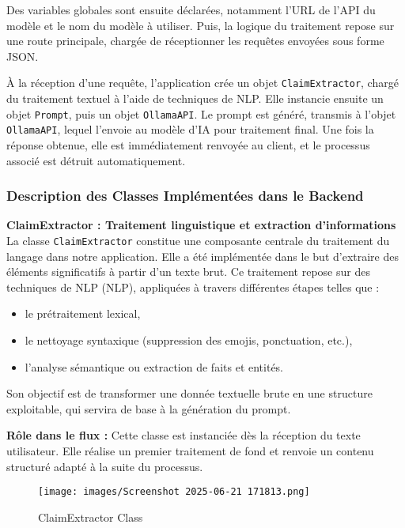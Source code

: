 \begin{description}
\begin{description}
Des variables globales sont ensuite déclarées, notamment l'URL de l'API du modèle et le nom du modèle à utiliser. Puis, la logique du traitement repose sur une route principale, chargée de réceptionner les requêtes envoyées sous forme JSON.

À la réception d'une requête, l'application crée un objet \texttt{ClaimExtractor}, chargé du traitement textuel à l'aide de techniques de NLP. Elle instancie ensuite un objet \texttt{Prompt}, puis un objet \texttt{OllamaAPI}. Le prompt est généré, transmis à l'objet \texttt{OllamaAPI}, lequel l'envoie au modèle d'IA pour traitement final. Une fois la réponse obtenue, elle est immédiatement renvoyée au client, et le processus associé est détruit automatiquement.
\subsubsection*{Description des Classes Implémentées dans le Backend}
\begin{description}
    \item \textbf{ClaimExtractor : Traitement linguistique et extraction d'informations}
La classe \texttt{ClaimExtractor} constitue une composante centrale du traitement du langage dans notre application. Elle a été implémentée dans le but d'extraire des éléments significatifs à partir d'un texte brut. Ce traitement repose sur des techniques de NLP (NLP), appliquées à travers différentes étapes telles que :
\begin{itemize}
    \item le prétraitement lexical,
    \item le nettoyage syntaxique (suppression des emojis, ponctuation, etc.),
    \item l'analyse sémantique ou extraction de faits et entités.
\end{itemize}
Son objectif est de transformer une donnée textuelle brute en une structure exploitable, qui servira de base à la génération du prompt.

\textbf{Rôle dans le flux :} Cette classe est instanciée dès la réception du texte utilisateur. Elle réalise un premier traitement de fond et renvoie un contenu structuré adapté à la suite du processus.
\begin{itemize}
   

\begin{figure}
    \centering
    \texttt{[image: images/Screenshot 2025-06-21 171813.png]} 
    \caption{ClaimExtractor Class} %
    \label{fig:logos} %
    

\end{figure}
\end{itemize}
\end{description}
\end{description}
\end{description}
